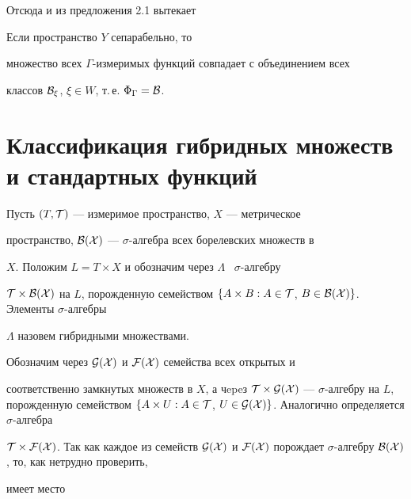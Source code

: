  


Отсюда и из предложения 2.1 вытекает 


 


\begin{cors} 


Если пространство $Y$ сепарабельно, то 


множество всех $\Gamma$-измеримых функций совпадает с объединением всех 


классов $\cal B_\xi$, $\xi\in W$, т.\,е. $\Phi_\Gamma=\cal B$. 


\end{cors} 


 


 


\section{Классификация гибридных множеств и стандартных функций} 


 


Пусть $(T,\cal T)$ --- измеримое пространство, $X$ --- метрическое 


пространство, $\cal B(X)$ --- $\sigma$-алгебра всех борелевских множеств в 


$X$. Положим $L=T\times X$ и обозначим через $\Lambda$ \ $\sigma$-алгебру 


$\cal T\times\cal B(X)$ на $L$, порожденную семейством $\{A\times B:A 


\in\cal T$, $B\in\cal B(X)\}$. Элементы $\sigma$-алгебры 


$\Lambda$ назовем гибридными множествами. 


 


Обозначим через $\cal G(X)$ и $\cal F(X)$ семейства всех открытых и 


соответственно замкнутых множеств в $X$, а чepeз $\cal T\times \cal 


G(X)$ --- $\sigma$-алгебру на $L$, порожденную семейством $\{A\times 


U:A\in\cal T$, $U\in\cal G(X)\}$. Аналогично определяется $\sigma$-алгебра 


$\cal T\times\cal F(X)$. Так как каждое из семейств $\cal G(X)$ и $\cal 


F(X)$ порождает $\sigma$-алгебру $\cal B(X)$, то, как нетрудно проверить, 


имеет место 


